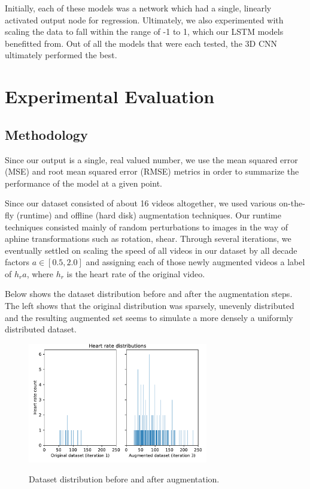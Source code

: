 \documentclass{article}
\begin{document}
Initially, each of these models was a network which had a single, linearly activated output node for regression. Ultimately, we also experimented with scaling the data to fall within the range of -1 to 1, which our LSTM models benefitted from. Out of all the models that were each tested, the 3D CNN ultimately performed the best.

\section[3]{Experimental Evaluation}
\subsection[3.1] {Methodology}
\noindent Since our output is a single, real valued number, we use the mean squared error (MSE) and root mean squared error (RMSE) metrics in order to summarize the performance of the model at a given point.

\noindent Since our dataset consisted of about 16 videos altogether, we used various on-the-fly (runtime) and offline (hard disk) augmentation techniques. Our runtime techniques consisted mainly of random perturbations to images in the way of aphine transformations such as rotation, shear. Through several iterations, we eventually settled on scaling the speed of all videos in our dataset by all decade factors $a \in [0.5, 2.0]$ and assigning each of those newly augmented videos a label of $h_{r}a$, where $h_{r}$ is the heart rate of the original video. 

Below shows the dataset distribution before and after the augmentation steps. The left shows that the original distribution was sparsely, unevenly distributed and the resulting augmented set seems to simulate a more densely a uniformly distributed dataset.
\begin{center}
\begin{figure}[htb]
\includegraphics[width=0.7\textwidth]{figs/dataset_distrib.pdf}
\label{fig:distrib}
\caption{Dataset distribution before and after augmentation.}
\end{figure}
\end{center}
\end{document}
